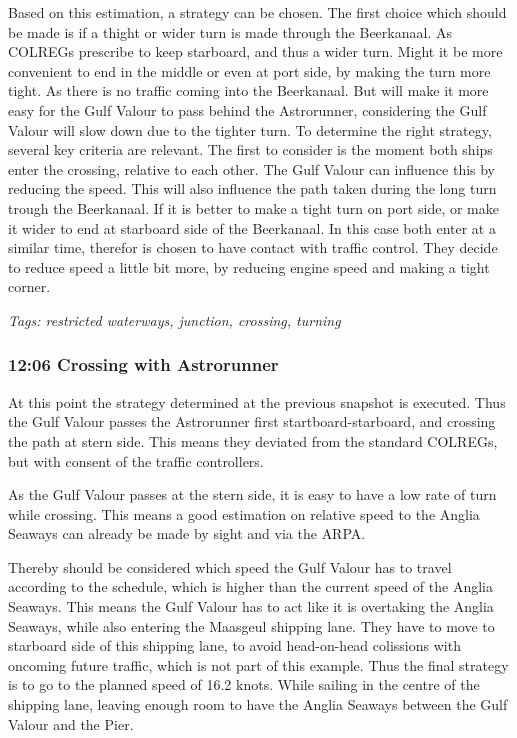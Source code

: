 Based on this estimation, a strategy can be chosen. The first choice which should be made is if a thight or wider turn is made through the Beerkanaal. As \ac{COLREGs} prescribe to keep starboard, and thus a wider turn. Might it be more convenient to end in the middle or even at port side, by making the turn more tight. As there is no traffic coming into the Beerkanaal. But will make it more easy for the Gulf Valour to pass behind the Astrorunner, considering the Gulf Valour will slow down due to the tighter turn. 
To determine the right strategy, several key criteria are relevant. The first to consider is the moment both ships enter the crossing, relative to each other. The Gulf Valour can influence this by reducing the speed. This will also influence the path taken during the long turn trough the Beerkanaal. If it is better to make a tight turn on port side, or make it wider to end at starboard side of the Beerkanaal.
In this case both enter at a similar time, therefor is chosen to have contact with traffic control. They decide to reduce speed a little bit more, by reducing engine speed and making a tight corner.

\emph{Tags: restricted waterways, junction, crossing, turning}

\subsubsection{12:06 Crossing with Astrorunner}
At this point the strategy determined at the previous snapshot is executed. Thus the Gulf Valour passes the Astrorunner first startboard-starboard, and crossing the path at stern side. This means they deviated from the standard \ac{COLREGs}, but with consent of the traffic controllers.

As the Gulf Valour passes at the stern side, it is easy to have a low rate of turn while crossing. This means a good estimation on relative speed to the Anglia Seaways can already be made by sight and via the \ac{ARPA}. 

Thereby should be considered which speed the Gulf Valour has to travel according to the schedule, which is higher than the current speed of the Anglia Seaways. This means the Gulf Valour has to act like it is overtaking the Anglia Seaways, while also entering the Maasgeul shipping lane. They have to move to starboard side of this shipping lane, to avoid head-on-head colissions with oncoming future traffic, which is not part of this example.
Thus the final strategy is to go to the planned speed of 16.2 knots. While sailing in the centre of the shipping lane, leaving enough room to have the Anglia Seaways between the Gulf Valour and the Pier.

